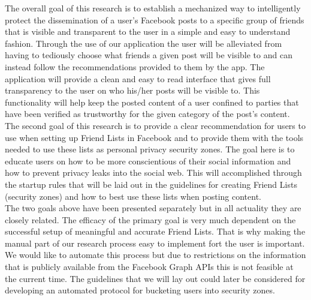 \tab The overall goal of this research is to establish a mechanized way to intelligently protect the dissemination of a user's Facebook posts to a specific group of friends that is visible and transparent to the user in a simple and easy to understand fashion. Through the use of our application the user will be alleviated from having to tediously choose what friends a given post will be visible to and can instead follow the recommendations provided to them by the app. The application will provide a clean and easy to read interface that gives full transparency to the user on who his/her posts will be visible to. This functionality will help keep the posted content of a user confined to parties that have been verified as trustworthy for the given category of the post's content. 
\\
\tab The second goal of this research is to provide a clear recommendation for users to use when setting up Friend Lists in Facebook and to provide them with the tools needed to use these lists as personal privacy security zones. The goal here is to educate users on how to be more conscientious of their social information and how to prevent privacy leaks into the social web. This will accomplished through the startup rules that will be laid out in the guidelines for creating Friend Lists (security zones) and how to best use these lists when posting content. 
\\
\tab The two goals above have been presented separately but in all actuality they are closely related. The efficacy of the primary goal is very much dependent on the successful setup of meaningful and accurate Friend Lists. That is why making the manual part of our research process easy to implement fort the user is important. We would like to automate this process but due to restrictions on the information that is publicly available from the Facebook Graph APIs this is not feasible at the current time. The guidelines that we will lay out could later be considered for developing an automated protocol for bucketing users into security zones. 
